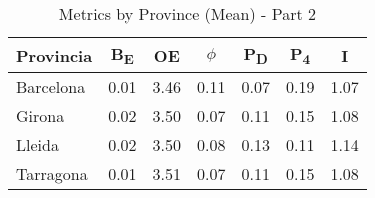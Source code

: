 \begin{table}[h!]
\centering
\begin{tabular}{lcccccc}
\hline
Provincia & \textbf{B\textsubscript{E}} & \textbf{OE} & \textbf{$\phi$} & \textbf{P\textsubscript{D}} & \textbf{P\textsubscript{4}} & \textbf{I} \\
\hline
Barcelona & 0.01 & 3.46 & 0.11 & 0.07 & 0.19 & 1.07 \\
Girona & 0.02 & 3.50 & 0.07 & 0.11 & 0.15 & 1.08 \\
Lleida & 0.02 & 3.50 & 0.08 & 0.13 & 0.11 & 1.14 \\
Tarragona & 0.01 & 3.51 & 0.07 & 0.11 & 0.15 & 1.08 \\
\hline
\end{tabular}
\caption {Metrics by Province (Mean) - Part 2}
\end{table}
